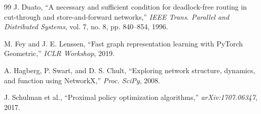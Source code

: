\documentclass[conference]{IEEEtran}
\begin{document}
\begin{thebibliography}{99}
 J. Duato, ``A necessary and sufficient condition for deadlock-free routing in cut-through and store-and-forward networks,'' \textit{IEEE Trans. Parallel and Distributed Systems}, vol. 7, no. 8, pp. 840--854, 1996.

 M. Fey and J. E. Lenssen, ``Fast graph representation learning with PyTorch Geometric,'' \textit{ICLR Workshop}, 2019.

 A. Hagberg, P. Swart, and D. S. Chult, ``Exploring network structure, dynamics, and function using NetworkX,'' \textit{Proc. SciPy}, 2008.

 J. Schulman et al., ``Proximal policy optimization algorithms,'' \textit{arXiv:1707.06347}, 2017.

\end{thebibliography}
\end{document}
